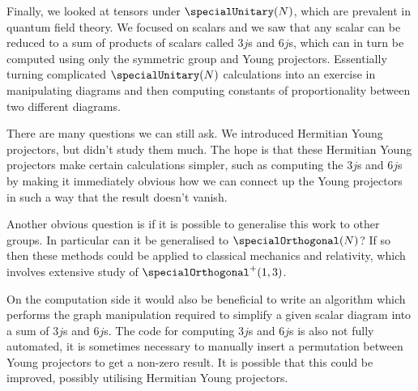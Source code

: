 \documentclass[fleqn]{NotesClass}
\begin{document}
    Finally, we looked at tensors under \(\specialUnitary(N)\), which are prevalent in quantum field theory.
    We focused on scalars and we saw that any scalar can be reduced to a sum of products of scalars called \(3j\)s and \(6j\)s, which can in turn be computed using only the symmetric group and Young projectors.
    Essentially turning complicated \(\specialUnitary(N)\) calculations into an exercise in manipulating diagrams and then computing constants of proportionality between two different diagrams.
    
    There are many questions we can still ask.
    We introduced Hermitian Young projectors, but didn't study them much.
    The hope is that these Hermitian Young projectors make certain calculations simpler, such as computing the \(3j\)s and \(6j\)s by making it immediately obvious how we can connect up the Young projectors in such a way that the result doesn't vanish.
    
    Another obvious question is if it is possible to generalise this work to other groups.
    In particular can it be generalised to \(\specialOrthogonal(N)\)?
    If so then these methods could be applied to classical mechanics and relativity, which involves extensive study of \(\specialOrthogonal^+(1, 3)\).
    
    On the computation side it would also be beneficial to write an algorithm which performs the graph manipulation required to simplify a given scalar diagram into a sum of \(3j\)s and \(6j\)s.
    The code for computing \(3j\)s and \(6j\)s is also not fully automated, it is sometimes necessary to manually insert a permutation between Young projectors to get a non-zero result.
    It is possible that this could be improved, possibly utilising Hermitian Young projectors.
    
\end{document}
